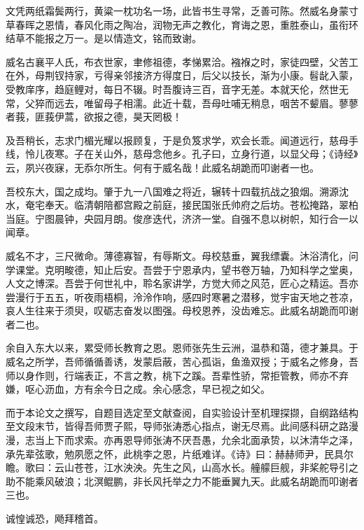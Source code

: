 \begin{acknowledgement}
文凭两纸霜鬓两行，黄粱一枕功名一场，此皆书生寻常，乏善可陈。然威名身蒙寸草春晖之恩情，春风化雨之陶冶，润物无声之教化，育诲之恩，重胜泰山，虽衔环结草不能报之万一。是以情造文，铭而致谢。

威名古襄平人氏，布衣世家，聿修祖德，孝悌累洽。襁褓之时，家徒四壁，父苦工在外，母荆钗持家，亏得亲邻接济方得度日，后父以技长，渐为小康。髫龀入蒙，受教庠序，趋庭鲤对，每日不辍。时吾腹诗三百，音字无差。本就天伦，然世无常，父猝而远去，唯留母子相濡。此近十载，吾母吐哺无稍息，咽苦不颦眉。蓼蓼者莪，匪莪伊蒿，欲报之德，昊天罔极！

及吾稍长，志求门楣光耀以报顾复，于是负笈求学，欢会长乖。闻道远行，慈母手线，怜儿夜寒。子在关山外，慈母念他乡。孔子曰，立身行道，以显父母；《诗经》云，夙兴夜寐，无忝尔所生。何有于威名哉！此威名胡跪而叩谢者一也。

吾校东大，国之成均。肇于九一八国难之将近，辗转十四载抗战之狼烟。溯源沈水，奄宅奉天。临清朝陪都宫殿之前庭，接民国张氏帅府之后坊。苍松掩路，翠柏当庭。宁图晨钟，央园月朗。俊彦迭代，济济一堂。自强不息以树帜，知行合一以闻章。

威名不才，三尺微命。薄德寡智，有辱斯文。母校慈垂，翼我缥囊。沐浴清化，问学课堂。克明畯德，知止后安。吾尝于宁恩承内，望书卷万轴，乃知科学之堂奥，人文之博深。吾尝于何世礼中，聆名家讲学，方觉大师之风范，匠心之精运。吾亦尝漫行于五五，听夜雨梧桐，泠泠作响，感四时寒暑之潜移，觉宇宙天地之苍凉，哀人生往来于须臾，叹砺志奋发以图强。母校恩养，没齿难忘。此威名胡跪而叩谢者二也。

余自入东大以来，累受师长教育之恩。恩师张先生云洲，温恭和蔼，德才兼具。于威名之所学，吾师循循善诱，发蒙启蔽，苦心孤诣，鱼渔双授；于威名之修身，吾师以身作则，行端表正，不言之教，桃下之蹊。吾辈性骄，常拒管教，师亦不弃嫌，呕心沥血，方有余今日之成。余心感念，早已视之如父。

而于本论文之撰写，自题目选定至文献查阅，自实验设计至机理探撷，自纲路结构至文段末节，皆得吾师贾子熙，导师张涛悉心指点，谢无尽焉。此间感科研之路漫漫，志当上下而求索。亦再恩导师张涛不厌吾愚，允余北面承贽，以沐清华之泽，承先辈弦歌，勉夙愿之怀，此桃李之恩，片纸难详。《诗》曰：赫赫师尹，民具尔瞻。歌曰：云山苍苍，江水泱泱。先生之风，山高水长。艟艨巨舰，非桨舵导引之助不能乘风破浪；北溟鲲鹏，非长风托举之力不能垂翼九天。此威名胡跪而叩谢者三也。

诚惶诚恐，飏拜稽首。




\end{acknowledgement}
